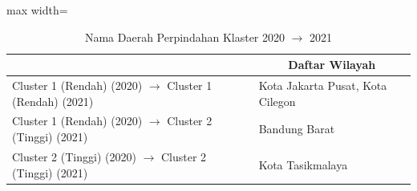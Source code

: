 \begin{table}[H]
\centering
\caption{Nama Daerah Perpindahan Klaster 2020 \(\rightarrow\) 2021} \label{tab:sample1transname2020x2021}
\begin{adjustbox}{max width=\textwidth}
\begin{tabular}{|>{\centering\arraybackslash}p{4cm}|p{10cm}|}
\hline
\multicolumn{1}{|c|}{\textbf{Kategori}} & \multicolumn{1}{c|}{\textbf{Daftar Wilayah}} \\
\hline
Cluster 1 (Rendah) (2020) \(\rightarrow\) Cluster 1 (Rendah) (2021) & Kota Jakarta Pusat, Kota Cilegon \\
\hline
Cluster 1 (Rendah) (2020) \(\rightarrow\) Cluster 2 (Tinggi) (2021) & Bandung Barat \\
\hline
Cluster 2 (Tinggi) (2020) \(\rightarrow\) Cluster 2 (Tinggi) (2021) & Kota Tasikmalaya \\
\hline
\end{tabular}
\end{adjustbox}
\end{table}
